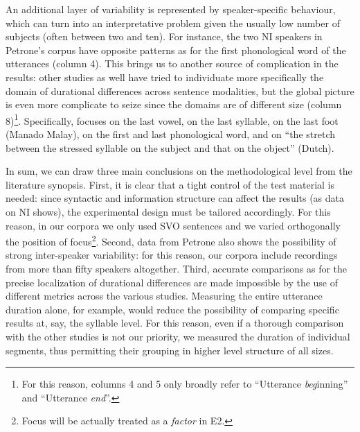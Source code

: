 An additional layer of variability is represented by speaker-specific behaviour, which can turn into an interpretative problem given the usually low number of subjects (often between two and ten). For instance, the two NI speakers in Petrone's corpus have opposite patterns as for the first phonological word of the utterances (column 4). This brings us to another source of complication in the results: other studies as well have tried to individuate more specifically the domain of durational differences across sentence modalities, but the global picture is even more complicate to seize since the domains are of different size (column 8)\footnote{For this reason, columns 4 and 5 only broadly refer to ``Utterance \textit{beg}inning'' and ``Utterance \textit{end}''.}. Specifically, \citet{smith2002prosodic} focuses on the last vowel, \citet{ryalls1994effects} on the last syllable, \citet{vanheuven2005speech} on the last foot (Manado Malay), \citet{petrone2008role} on the first and last phonological word, and \citet{vanheuven2005speech} on ``the stretch between the stressed syllable on the subject and that on the object'' (Dutch). 

In sum, we can draw three main conclusions on the methodological level from the literature synopsis. First, it is clear that a tight control of the test material is needed: since syntactic and information structure can affect the results (as data on NI shows), the experimental design must be tailored accordingly. For this reason, in our corpora we only used SVO sentences and we varied orthogonally the position of focus\footnote{Focus will be actually treated as a \textit{factor} in E2.}. Second, data from Petrone also shows the possibility of strong inter-speaker variability: for this reason, our corpora include recordings from more than fifty speakers altogether. Third, accurate comparisons as for the precise localization of durational differences are made impossible by the use of different metrics across the various studies. Measuring the entire utterance duration alone, for example, would reduce the possibility of comparing specific results at, say, the syllable level. For this reason, even if a thorough comparison with the other studies is not our priority, we measured the duration of individual segments, thus permitting their grouping in higher level structure of all sizes.

